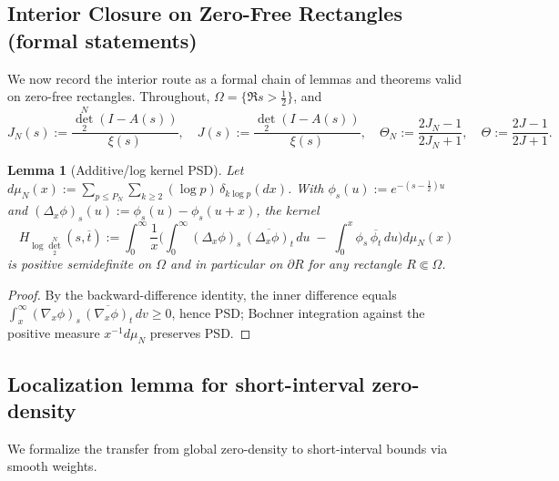 \documentclass[11pt]{article}
\newtheorem{lemma}[theorem]{Lemma}
\theoremstyle{remark}
\begin{document}
\subsection*{Interior Closure on Zero-Free Rectangles (formal statements)}
We now record the interior route as a formal chain of lemmas and theorems valid on zero-free rectangles. Throughout, \(\Omega=\{\Re s>\tfrac12\}\), and
\[J_N(s):=\frac{\det_2^N(I-A(s))}{\xi(s)},\quad J(s):=\frac{\det_2(I-A(s))}{\xi(s)},\quad \Theta_N:=\frac{2J_N-1}{2J_N+1},\quad \Theta:=\frac{2J-1}{2J+1}.
\]

\begin{lemma}[Additive/log kernel PSD]\label{lem:log-psd-formal}
Let \(d\mu_N(x):=\sum_{p\le P_N}\sum_{k\ge2}(\log p)\,\delta_{k\log p}(dx)\). With \(\phi_s(u):=e^{-(s-\frac12)u}\) and \((\Delta_x\phi)_s(u):=\phi_s(u)-\phi_s(u+x)\), the kernel
\[H_{\log\det_2^N}(s,\overline t):=\int_0^\infty \frac{1}{x}\Big(\int_0^\infty (\Delta_x\phi)_s\,\overline{(\Delta_x\phi)_t}\,du\; -\; \int_0^x \phi_s\,\overline{\phi_t}\,du\Big)d\mu_N(x)
\]
is positive semidefinite on \(\Omega\) and in particular on \(\partial R\) for any rectangle \(R\Subset\Omega\).
\end{lemma}
\begin{proof}
By the backward-difference identity, the inner difference equals \(\int_x^\infty (\nabla_x\phi)_s\,\overline{(\nabla_x\phi)_t}\,dv\ge0\), hence PSD; Bochner integration against the positive measure \(x^{-1}d\mu_N\) preserves PSD.
\end{proof}

\subsection{Localization lemma for short-interval zero-density}\label{subsec:ZD-local}
We formalize the transfer from global zero-density to short-interval bounds via smooth weights.
\end{document}
